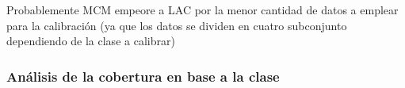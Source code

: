 Probablemente MCM empeore a LAC por la menor cantidad de datos a emplear para la calibración (ya que los datos se dividen en cuatro subconjunto dependiendo de la clase a calibrar)



\subsubsection{Análisis de la cobertura en base a la clase}









